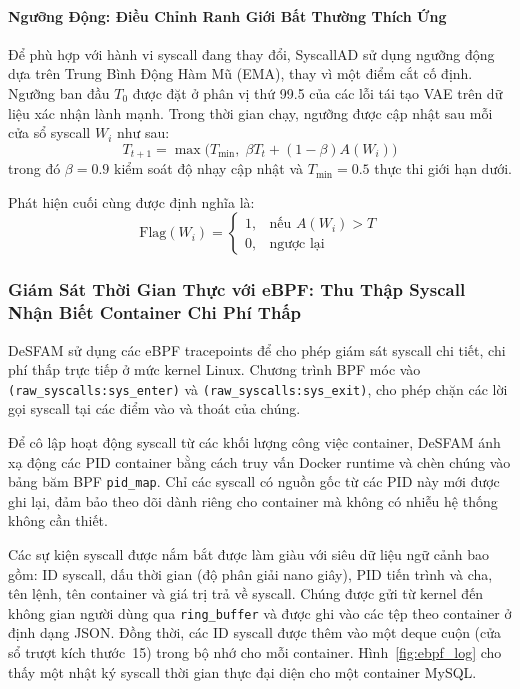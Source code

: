 \paragraph{Ngưỡng Động: Điều Chỉnh Ranh Giới Bất Thường Thích Ứng}
Để phù hợp với hành vi syscall đang thay đổi, SyscallAD sử dụng ngưỡng động dựa trên Trung Bình
Động Hàm Mũ (EMA), thay vì một điểm cắt cố định. Ngưỡng ban đầu $T_0$ được đặt ở phân vị thứ
99.5 của các lỗi tái tạo VAE trên dữ liệu xác nhận lành mạnh. Trong thời gian chạy, ngưỡng
được cập nhật sau mỗi cửa sổ syscall $W_i$ như sau:
\begin{equation}
  T_{t+1} = \max\bigl(T_{\min},\; \beta T_t + (1 - \beta) A(W_i)\bigr)
  \label{eq:threshold}
\end{equation}
trong đó $\beta = 0.9$ kiểm soát độ nhạy cập nhật và $T_{\min} = 0.5$ thực thi giới hạn dưới.

Phát hiện cuối cùng được định nghĩa là:
\begin{equation}
  \mathrm{Flag}(W_i) =
  \begin{cases}
    1, & \text{nếu } A(W_i) > T \\
    0, & \text{ngược lại}
  \end{cases}
  \label{eq:flag}
\end{equation}

\subsubsection{Giám Sát Thời Gian Thực với eBPF: Thu Thập Syscall Nhận Biết Container Chi Phí Thấp}
\label{subsubsec:ebpf_monitoring}

DeSFAM sử dụng các eBPF tracepoints để cho phép giám sát syscall chi tiết, chi phí thấp trực
tiếp ở mức kernel Linux. Chương trình BPF móc vào
\texttt{(raw\_syscalls:sys\_enter)} và \texttt{(raw\_syscalls:sys\_exit)}, cho phép chặn các lời
gọi syscall tại các điểm vào và thoát của chúng.

Để cô lập hoạt động syscall từ các khối lượng công việc container, DeSFAM ánh xạ động các PID
container bằng cách truy vấn Docker runtime và chèn chúng vào bảng băm BPF \texttt{pid\_map}.
Chỉ các syscall có nguồn gốc từ các PID này mới được ghi lại, đảm bảo theo dõi dành riêng cho
container mà không có nhiễu hệ thống không cần thiết.

Các sự kiện syscall được nắm bắt được làm giàu với siêu dữ liệu ngữ cảnh bao gồm: ID syscall,
dấu thời gian (độ phân giải nano giây), PID tiến trình và cha, tên lệnh, tên container và giá
trị trả về syscall. Chúng được gửi từ kernel đến không gian người dùng qua \texttt{ring\_buffer}
và được ghi vào các tệp theo container ở định dạng JSON. Đồng thời, các ID syscall được thêm vào
một deque cuộn (cửa sổ trượt kích thước~15) trong bộ nhớ cho mỗi container.
Hình~\ref{fig:ebpf_log} cho thấy một nhật ký syscall thời gian thực đại diện cho một container MySQL.

